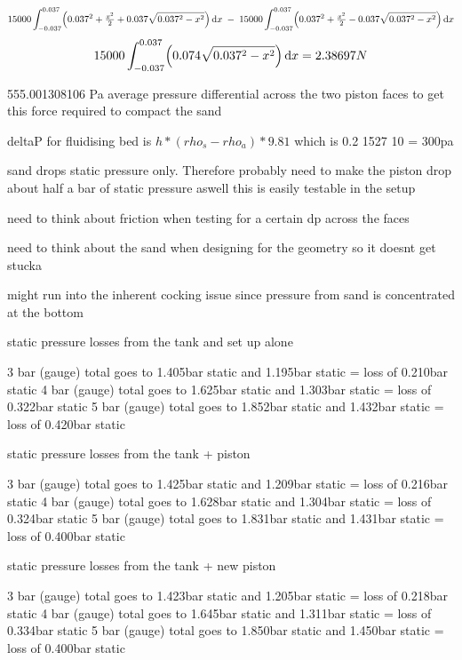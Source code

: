\begin{equation}
    15000\int_{-0.037}^{0.037}\Bigl(0.037^2 + \tfrac{x^2}{2} + 0.037\sqrt{0.037^2 - x^2}\Bigr)\,\mathrm{d}x
    \;-\;
    15000\int_{-0.037}^{0.037}\Bigl(0.037^2 + \tfrac{x^2}{2} - 0.037\sqrt{0.037^2 - x^2}\Bigr)\,\mathrm{d}x
\end{equation}
\begin{equation}
    15000\int_{-0.037}^{0.037}\Bigl(0.074\sqrt{0.037^2 - x^2}\Bigr)\,\mathrm{d}x = 2.38697N
\end{equation}

555.001308106 Pa average pressure differential across the two piston faces to get this force required to compact the sand

deltaP for fluidising bed is $h*(rho_s - rho_a)*9.81$ which is 0.2 1527 10 = 300pa


sand drops static pressure only. Therefore probably need to make the piston drop about half a bar of static pressure aswell
this is easily testable in the setup

need to think about friction when testing for a certain dp across the faces

need to think about the sand when designing for the geometry so it doesnt get stucka

might run into the inherent cocking issue since pressure from sand is concentrated at the bottom

static pressure losses from the tank and set up alone

3 bar (gauge) total goes to 1.405bar static and 1.195bar static = loss of 0.210bar static
4 bar (gauge) total goes to 1.625bar static and 1.303bar static = loss of 0.322bar static
5 bar (gauge) total goes to 1.852bar static and 1.432bar static = loss of 0.420bar static

static pressure losses from the tank + piston

3 bar (gauge) total goes to 1.425bar static and 1.209bar static = loss of 0.216bar static
4 bar (gauge) total goes to 1.628bar static and 1.304bar static = loss of 0.324bar static
5 bar (gauge) total goes to 1.831bar static and 1.431bar static = loss of 0.400bar static

static pressure losses from the tank + new piston

3 bar (gauge) total goes to 1.423bar static and 1.205bar static = loss of 0.218bar static
4 bar (gauge) total goes to 1.645bar static and 1.311bar static = loss of 0.334bar static
5 bar (gauge) total goes to 1.850bar static and 1.450bar static = loss of 0.400bar static

